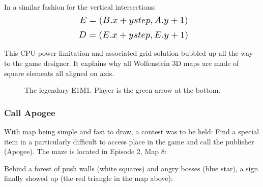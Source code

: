 In a similar fashion for the vertical intersections:\\
  \begin{equation*}
    \scalebox{1.3}{

$E = (B.x + ystep, A.y + 1)$\\
}
\end{equation*}
  \begin{equation*}
    \scalebox{1.3}{
$D = (E.x + ystep, E.y + 1)$\\
}
\end{equation*}

This CPU power limitation and associated grid solution bubbled up all the way to the game designer. It explains why all Wolfenstein 3D maps are made of square elements all aligned on axis.\\
\par
\begin{figure}[H]
  \centering
 \caption{The legendary E1M1. Player is the green arrow at the bottom.}
\end{figure}


\subsubsection{Call Apogee}
With map being simple and fast to draw, a contest was to be held: Find a special item in a particularly difficult to access place in the game and call the publisher (Apogee). The maze is located in Episode 2, Map 8:\\
\par
\begin{figure}[H]
  \centering
\end{figure}

\par
Behind a forest of push walls (white squares) and angry bosses (blue star), a sign finally showed up (the red triangle in the map above):\\
\par

